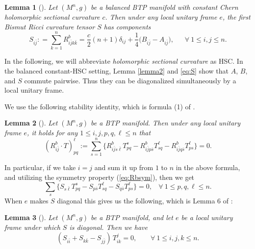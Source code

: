 \documentclass{amsart}
\newtheorem{lemma}{Lemma}
\begin{document}
\begin{lemma}[\cite{WZ}] \label{lemmaS}
Let $(M^n,g)$ be a balanced BTP manifold with constant Chern holomorphic sectional curvature $c$. Then under any local unitary frame $e$, the first Bismut Ricci curvature tensor $S$ has components
\begin{equation} \label{eq:S}
S_{i\bar{j}} : = \sum_{k=1}^n R^b_{i\bar{j}k\bar{k}} = \frac{c}{2}(n+1) \delta_{ij} + \frac{1}{4}\big( B_{i\bar{j}} - A_{i\bar{j}}  \big), \ \ \ \ \ \ \ \forall \ 1\leq i,j\leq n.
\end{equation}
\end{lemma}

In the following, we will abbreviate {\em holomorphic sectional curvature} as HSC. In the balanced constant-HSC setting, Lemma \ref{lemma2} and
\eqref{eq:S} show that $A$, $B$, and $S$ commute pairwise. Thus they
can be diagonalized simultaneously by a local unitary frame.


We use the following stability identity, which is formula (1) of \cite{WZ}.

\begin{lemma}[\cite{WZ}] \label{lemma-stab}
Let $(M^n,g)$ be a BTP manifold. Then under any local unitary frame $e$, it holds for any $1\leq i,j,p, q,\ell \leq n$ that
\begin{equation}  \label{eq:stab}
 (R^b_{i\bar{j}}\cdot T)^{\ell}_{pq} := \sum_{s=1}^n \big\{ R^b_{i\bar{j}s\bar{\ell}}T^s_{pq} - R^b_{i\bar{j}p\bar{s}}T^{\ell}_{sq} - R^b_{i\bar{j}q\bar{s}}T^{\ell}_{ps} \big\} =0.
 \end{equation}
\end{lemma}

 In particular, if we take $i=j$ and sum it up from $1$ to $n$ in the above formula, and utilizing the symmetry property (\ref{eq:Rbsym}), then we get
\begin{equation}  \label{eq:stabS}
  \sum_{s} \big\{ S_{s\bar{\ell}}T^s_{pq} - S_{p\bar{s}}T^{\ell}_{sq} - S_{q\bar{s}}T^{\ell}_{ps} \big\} =0, \ \ \ \ \forall \ 1\leq p,q,\ell \leq n.
 \end{equation}
When $e$ makes $S$ diagonal this gives us the following, which is Lemma 6 of \cite{WZ}:

\begin{lemma}[\cite{WZ}] \label{lemmastabS2}
Let $(M^n,g)$ be a BTP manifold, and let $e$ be a local unitary frame under which $S$ is diagonal. Then we have
\begin{equation} \label{eq:stabS2}
(S_{i\bar{i}} + S_{k\bar{k}}-S_{j\bar{j}})\,T^j_{ik} = 0, \ \ \ \ \ \ \ \ \ \forall \ 1\leq i,j,k\leq n.
\end{equation}
\end{lemma}
\end{document}
